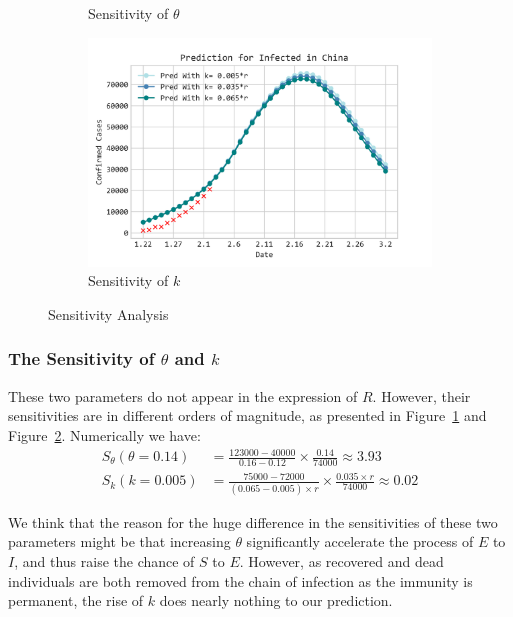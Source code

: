 \documentclass[12pt]{mcmthesis}
\begin{document}
\begin{figure}[H]
\begin{subfigure}[t]{0.45\textwidth}
        \caption{Sensitivity of $\theta$}
        \label{fig:Sens_thita}
    \end{subfigure}
    \begin{subfigure}[t]{0.45\textwidth}
        \includegraphics[width=1.0\textwidth]{053/figure/Sens_k.png}
        \caption{Sensitivity of $k$}
        \label{fig:Sens_k}
    \end{subfigure}
    \caption{Sensitivity Analysis}   \label{fig:Sens}
\end{figure}

\subsubsection{The Sensitivity of $\theta$ and $k$}
These two parameters do not appear in the expression of $R$. However, their sensitivities are in different orders of magnitude, as presented in Figure~\ref{fig:Sens_thita} and Figure~\ref{fig:Sens_k}. Numerically we have:
\begin{align*}
    S_{\theta}(\theta = 0.14) &= \frac{123000 - 40000}{0.16 - 0.12} \times \frac{0.14}{74000} \approx 3.93 \\
    S_k(k = 0.005) &= \frac{75000 - 72000}{(0.065 - 0.005) \times r} \times \frac{0.035 \times r}{74000} \approx 0.02
\end{align*}

We think that the reason for the huge difference in the sensitivities of these two parameters might be that increasing $\theta$ significantly accelerate the process of $E$ to $I$, and thus raise the chance of $S$ to $E$. However, as recovered and dead individuals are both removed from the chain of infection as the immunity is permanent, the rise of $k$ does nearly nothing to our prediction.
\end{document}
